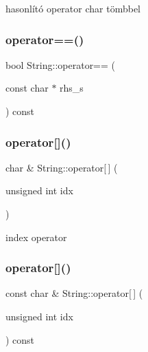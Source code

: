 hasonlító operator char tömbbel 

\mbox{\label{class_string_aa50c56cbbbc9956cb359a7617f13809b}} 
\subsubsection{\texorpdfstring{operator==()}{operator==()}\hspace{0.1cm}{\footnotesize\ttfamily [3/3]}}
{\footnotesize\ttfamily bool String\+::operator== (\begin{DoxyParamCaption}\item[{const char $\ast$}]{rhs\+\_\+s }\end{DoxyParamCaption}) const}

\mbox{\label{class_string_a1a7c5c39d4dafbbf8516f5058a253f1a}} 
\subsubsection{\texorpdfstring{operator[]()}{operator[]()}\hspace{0.1cm}{\footnotesize\ttfamily [1/2]}}
{\footnotesize\ttfamily char \& String\+::operator\mbox{[}$\,$\mbox{]} (\begin{DoxyParamCaption}\item[{unsigned int}]{idx }\end{DoxyParamCaption})}



index operator 

\mbox{\label{class_string_aaa249e62641872197679cfc7c66118c0}} 
\subsubsection{\texorpdfstring{operator[]()}{operator[]()}\hspace{0.1cm}{\footnotesize\ttfamily [2/2]}}
{\footnotesize\ttfamily const char \& String\+::operator\mbox{[}$\,$\mbox{]} (\begin{DoxyParamCaption}\item[{unsigned int}]{idx }\end{DoxyParamCaption}) const}



